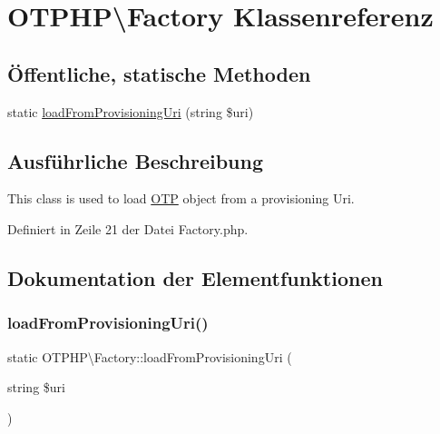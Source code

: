 \hypertarget{class_o_t_p_h_p_1_1_factory}{}\section{O\+T\+P\+HP\textbackslash{}Factory Klassenreferenz}
\label{class_o_t_p_h_p_1_1_factory}
\subsection*{Öffentliche, statische Methoden}
\begin{DoxyCompactItemize}
\item 
static \mbox{\hyperlink{class_o_t_p_h_p_1_1_factory_a1aa8d95270cb18e2a44ed9bc9ba6df84}{load\+From\+Provisioning\+Uri}} (string \$uri)
\end{DoxyCompactItemize}


\subsection{Ausführliche Beschreibung}
This class is used to load \mbox{\hyperlink{class_o_t_p_h_p_1_1_o_t_p}{O\+TP}} object from a provisioning Uri. 

Definiert in Zeile 21 der Datei Factory.\+php.



\subsection{Dokumentation der Elementfunktionen}
\mbox{\label{class_o_t_p_h_p_1_1_factory_a1aa8d95270cb18e2a44ed9bc9ba6df84}} 
\subsubsection{\texorpdfstring{load\+From\+Provisioning\+Uri()}{loadFromProvisioningUri()}}
{\footnotesize\ttfamily static O\+T\+P\+H\+P\textbackslash{}\+Factory\+::load\+From\+Provisioning\+Uri (\begin{DoxyParamCaption}\item[{string}]{\$uri }\end{DoxyParamCaption})\hspace{0.3cm}{\ttfamily [static]}}

